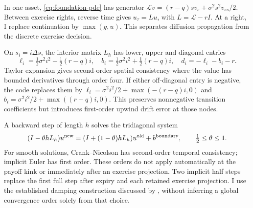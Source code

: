 \documentclass[11pt]{article}
\begin{document}
In one asset, \eqref{eq:foundation-pde} has generator $\mathcal L v=(r-q)s v_s+\sigma^2s^2v_{ss}/2$. Between exercise rights, reverse time gives $u_\tau=Lu$, with $L=\mathcal L-rI$. At a right, I replace continuation by $\max(g,u)$. This separates diffusion propagation from the discrete exercise decision.

On $s_i=i\Delta s$, the interior matrix $L_h$ has lower, upper and diagonal entries
\begin{equation}
 \ell_i=\tfrac12\sigma^2i^2-\tfrac12(r-q)i,
 \quad b_i=\tfrac12\sigma^2i^2+\tfrac12(r-q)i,
 \quad d_i=-\ell_i-b_i-r.
 \label{eq:foundation-space}
\end{equation}
Taylor expansion gives second-order spatial consistency where the value has bounded derivatives through order four. If either off-diagonal entry is negative, the code replaces them by $\ell_i=\sigma^2i^2/2+\max(-(r-q)i,0)$ and $b_i=\sigma^2i^2/2+\max((r-q)i,0)$. This preserves nonnegative transition coefficients but introduces first-order upwind drift error at those nodes.

A backward step of length $h$ solves the tridiagonal system
\begin{equation}
 (I-\theta hL_h)u^{\rm new}
 =(I+(1-\theta)hL_h)u^{\rm old}+b^{\rm boundary},
 \qquad \tfrac12\leq\theta\leq1.
 \label{eq:foundation-theta}
\end{equation}
For smooth solutions, Crank--Nicolson has second-order temporal consistency; implicit Euler has first order. These orders do not apply automatically at the payoff kink or immediately after an exercise projection. Two implicit half steps replace the first full step after expiry and each retained exercise projection. I use the established damping construction discussed by \citet{giles2006}, without inferring a global convergence order solely from that choice.
\end{document}

